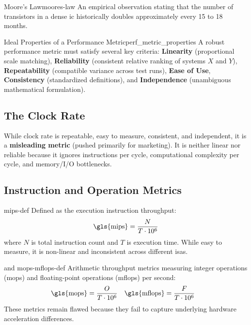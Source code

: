 \begin{concept}{Moore's Law}{moores-law}
    An empirical observation stating that the number of transistors in a dense \gls{ic} historically doubles approximately every 15 to 18 months.
\end{concept}

\begin{definition}{Ideal Properties of a Performance Metric}{perf_metric_properties}
    A robust performance metric must satisfy several key criteria: \textbf{Linearity} (proportional scale matching), \textbf{Reliability} (consistent relative ranking of systems \(X\) and \(Y\)), \textbf{Repeatability} (compatible variance across test runs), \textbf{Ease of Use}, \textbf{Consistency} (standardized definitions), and \textbf{Independence} (unambiguous mathematical formulation).
\end{definition}

\subsection{The Clock Rate}
While clock rate is repeatable, easy to measure, consistent, and independent, it is a \textbf{misleading metric} (pushed primarily for marketing). It is neither linear nor reliable because it ignores instructions per cycle, computational complexity per cycle, and memory/I/O bottlenecks.

\subsection{Instruction and Operation Metrics}
\begin{definition}{}{mips-def}
    Defined as the execution instruction throughput:
    \[
        \text{\gls{mips}} = \frac{N}{T \cdot 10^6}
    \]
    where \(N\) is total instruction count and \(T\) is execution time. While easy to measure, it is non-linear and inconsistent across different \glspl{isa}.
\end{definition}

\begin{definition}{ and }{mops-mflops-def}
    Arithmetic throughput metrics measuring integer operations (\gls{mops}) and floating-point operations (\gls{mflops}) per second:
    \begin{align*}
        \text{\gls{mops}} &= \frac{O}{T \cdot 10^6} & \text{\gls{mflops}} &= \frac{F}{T \cdot 10^6}
    \end{align*}
    These metrics remain flawed because they fail to capture underlying hardware acceleration differences.
\end{definition}

